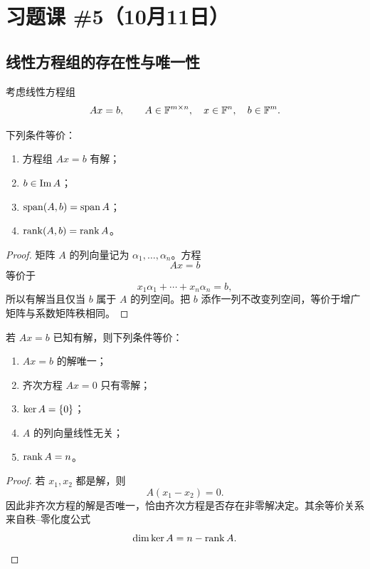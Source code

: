 \section{习题课 \#5（10月11日）}

\subsection{线性方程组的存在性与唯一性}

考虑线性方程组
\begin{equation}
 Ax=b,
 \qquad
 A\in\mathbb F^{m\times n},\quad x\in\mathbb F^n,\quad b\in\mathbb F^m.
\end{equation}

\begin{theorem}[相容性判别]
下列条件等价：
\begin{enumerate}
  \item 方程组 $Ax=b$ 有解；
  \item $b\in\operatorname{Im} A$；
  \item $\operatorname{span}(A,b)=\operatorname{span} A$；
  \item $\operatorname{rank}(A,b)=\operatorname{rank} A$。
\end{enumerate}
\end{theorem}

\begin{proof}
矩阵 $A$ 的列向量记为 $\alpha_1,\ldots,\alpha_n$。方程
\begin{equation}
 Ax=b
\end{equation}
等价于
\begin{equation}
 x_1\alpha_1+\cdots+x_n\alpha_n=b,
\end{equation}
所以有解当且仅当 $b$ 属于 $A$ 的列空间。把 $b$ 添作一列不改变列空间，等价于增广矩阵与系数矩阵秩相同。
\end{proof}

\begin{theorem}[唯一性判别]
若 $Ax=b$ 已知有解，则下列条件等价：
\begin{enumerate}
  \item $Ax=b$ 的解唯一；
  \item 齐次方程 $Ax=0$ 只有零解；
  \item $\operatorname{ker} A=\{0\}$；
  \item $A$ 的列向量线性无关；
  \item $\operatorname{rank} A=n$。
\end{enumerate}
\end{theorem}

\begin{proof}
若 $x_1,x_2$ 都是解，则
\begin{equation}
 A(x_1-x_2)=0.
\end{equation}
因此非齐次方程的解是否唯一，恰由齐次方程是否存在非零解决定。其余等价关系来自秩--零化度公式
\begin{equation}
 \dim\operatorname{ker} A=n-\operatorname{rank} A.
\end{equation}
\end{proof}

